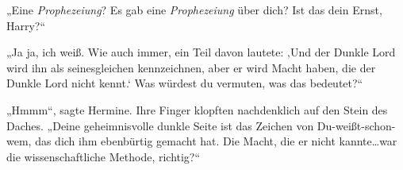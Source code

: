 „Eine \emph{Prophezeiung}? Es gab eine \emph{Prophezeiung} über dich? Ist das dein Ernst, Harry?“

„Ja ja, ich weiß. Wie auch immer, ein Teil davon lautete: ‚Und der Dunkle Lord wird ihn als seinesgleichen kennzeichnen, aber er wird Macht haben, die der Dunkle Lord nicht kennt.‘ Was würdest du vermuten, was das bedeutet?“

„Hmmm“, sagte Hermine. Ihre Finger klopften nachdenklich auf den Stein des Daches. „Deine geheimnisvolle dunkle Seite ist das Zeichen von Du-weißt-schon-wem, das dich ihm ebenbürtig gemacht hat. Die Macht, die er nicht kannte…war die wissenschaftliche Methode, richtig?“

